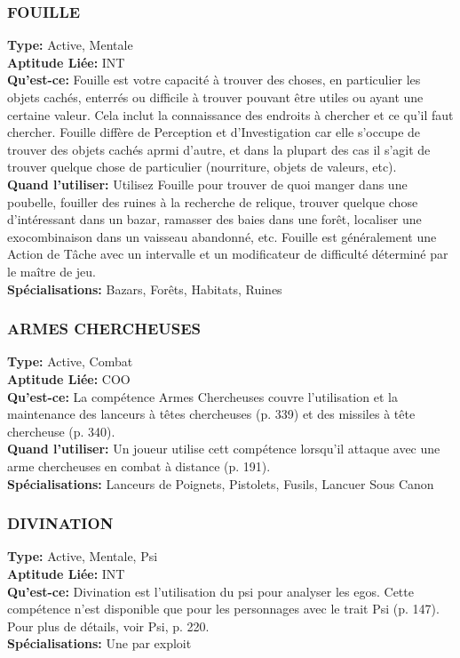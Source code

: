\subsubsection{FOUILLE} \textbf{Type:} Active, Mentale \\ \textbf{Aptitude Liée:} INT \\ \textbf{Qu'est-ce:} Fouille est votre capacité à trouver des choses, en particulier les objets cachés, enterrés ou difficile à trouver  pouvant être utiles ou ayant une certaine valeur. Cela inclut la connaissance des endroits à chercher et ce qu'il faut chercher. Fouille diffère de Perception et d'Investigation car elle s'occupe de trouver des objets cachés aprmi d'autre, et dans la plupart des cas il s'agit de trouver quelque chose de particulier (nourriture, objets de valeurs, etc). \\ \textbf{Quand l'utiliser:} Utilisez Fouille pour trouver de quoi manger dans une poubelle, fouiller des ruines à la recherche de relique, trouver quelque chose d'intéressant dans un bazar, ramasser des baies dans une forêt, localiser une exocombinaison dans un vaisseau abandonné, etc. Fouille est généralement une Action de Tâche avec un intervalle et un modificateur de difficulté déterminé par le maître de jeu. \\ \textbf{Spécialisations:} Bazars, Forêts, Habitats, Ruines 

\subsubsection{ARMES CHERCHEUSES} \textbf{Type:} Active, Combat \\ \textbf{Aptitude Liée:} COO \\ \textbf{Qu'est-ce:} La compétence Armes Chercheuses couvre l'utilisation et la maintenance des lanceurs à têtes chercheuses  (p. 339) et des missiles à tête chercheuse (p. 340). \\ \textbf{Quand l'utiliser:} Un joueur utilise cett compétence lorsqu'il attaque avec une arme chercheuses en combat à distance (p. 191). \\ \textbf{Spécialisations:} Lanceurs de Poignets, Pistolets, Fusils, Lancuer Sous Canon 

\subsubsection{DIVINATION} \textbf{Type:} Active, Mentale, Psi \\ \textbf{Aptitude Liée:} INT \\ \textbf{Qu'est-ce:} Divination est l'utilisation du psi pour analyser les egos. Cette compétence n'est disponible que pour les personnages avec le trait Psi (p. 147). Pour plus de détails, voir Psi, p. 220. \\ \textbf{Spécialisations:} Une par exploit 

